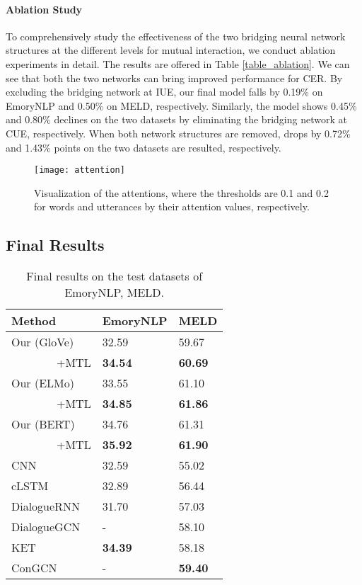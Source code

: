 \documentclass{article}
\begin{document}
\begin{CJK}{UTF8}{gbsn}
\paragraph{Ablation Study}
To comprehensively study the effectiveness of the two bridging neural network structures at the different levels for mutual interaction, we conduct ablation experiments in detail.  
The results are offered in Table \ref{table_ablation}.
We can see that both the two networks can bring improved performance for CER.
By excluding the bridging network at IUE, our final model falls by 0.19\% on EmoryNLP and 0.50\% on MELD, respectively. Similarly, the model shows 0.45\% and 0.80\% declines on the two datasets by eliminating the bridging network at CUE, respectively. 
When both network structures are removed,  drops by 0.72\% and 1.43\% points on the two datasets are resulted, respectively.


\begin{figure*}[tb]
  \centering
  \texttt{[image: attention]}
  \caption{Visualization of the attentions, where the thresholds are 0.1 and 0.2 for words and  utterances by their attention values, respectively.}
  \label{figure_attention}
\end{figure*}






\subsection{Final Results}

\begin{table}[tb]
  \centering
  \begin{tabular}{p{2.2cm}|p{2.0cm}<{\centering}|p{2.0cm}<{\centering}}
  \toprule[1pt]
  Method                          & EmoryNLP & MELD\\
  \midrule[0.5pt]
  Our (GloVe) & 32.59 & 59.67 \\
  ~~~~~~~~+MTL & \bf 34.54 & \bf 60.69 \\ \midrule[0.5pt]
  Our (ELMo)             & 33.55 & 61.10 \\
  ~~~~~~~~+MTL & \bf 34.85 & \bf 61.86 \\ \midrule[0.5pt]
  Our (BERT)             & 34.76 & 61.31 \\
  ~~~~~~~~+MTL & \textbf{35.92} & \textbf{61.90}    \\
  \midrule[0.5pt]
  \midrule[0.5pt]
  CNN & 32.59  & 55.02 \\
  cLSTM  & 32.89 & 56.44\\
  DialogueRNN & 31.70 & 57.03 \\
  DialogueGCN & - & 58.10\\
  KET & \bf 34.39 & 58.18 \\
  ConGCN & - & \bf 59.40 \\ 
  \bottomrule[1pt]
  \end{tabular}
  \caption{Final results on the test datasets of EmoryNLP, MELD.}
  \label{table_final_results}
\end{table}


\end{CJK}
\end{document}
